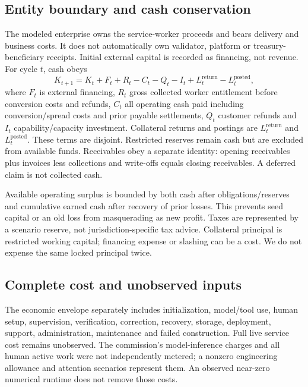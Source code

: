 \documentclass[11pt,a4paper]{article}
\begin{document}
\subsection{Entity boundary and cash conservation}
The modeled enterprise owns the service-worker proceeds and bears delivery and business costs. It does not automatically own validator, platform or treasury-beneficiary receipts. Initial external capital is recorded as financing, not revenue. For cycle $t$, cash obeys
\begin{equation}
K_{t+1}=K_t+F_t+R_t-C_t-Q_t-I_t+L^{\mathrm{return}}_t-L^{\mathrm{posted}}_t,
\end{equation}
where $F_t$ is external financing, $R_t$ gross collected worker entitlement before conversion costs and refunds, $C_t$ all operating cash paid including conversion/spread costs and prior payable settlements, $Q_t$ customer refunds and $I_t$ capability/capacity investment. Collateral returns and postings are $L^{\mathrm{return}}_t$ and $L^{\mathrm{posted}}_t$. These terms are disjoint. Restricted reserves remain cash but are excluded from available funds. Receivables obey a separate identity: opening receivables plus invoices less collections and write-offs equals closing receivables. A deferred claim is not collected cash.

Available operating surplus is bounded by both cash after obligations/reserves and cumulative earned cash after recovery of prior losses. This prevents seed capital or an old loss from masquerading as new profit. Taxes are represented by a scenario reserve, not jurisdiction-specific tax advice. Collateral principal is restricted working capital; financing expense or slashing can be a cost. We do not expense the same locked principal twice.

\subsection{Complete cost and unobserved inputs}
The economic envelope separately includes initialization, model/tool use, human setup, supervision, verification, correction, recovery, storage, deployment, support, administration, maintenance and failed construction. Full live service cost remains unobserved. The commission's model-inference charges and all human active work were not independently metered; a nonzero engineering allowance and attention scenarios represent them. An observed near-zero numerical runtime does not remove those costs.


\end{document}
